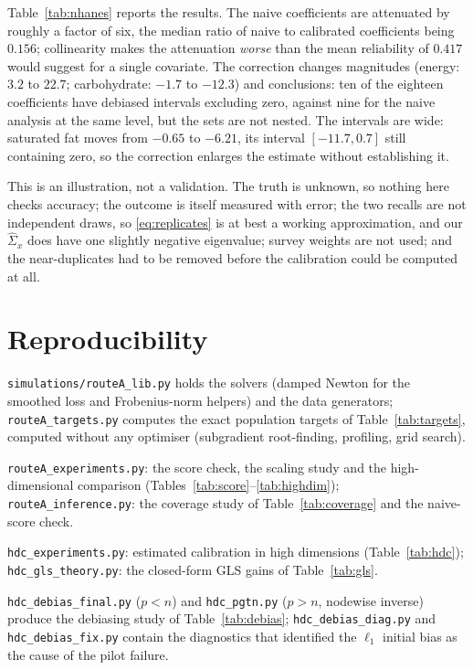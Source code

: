 \documentclass[12pt,a4paper]{article}
\theoremstyle{definition}
\theoremstyle{remark}
\begin{document}
Table~\ref{tab:nhanes} reports the results. The naive coefficients are attenuated by
roughly a factor of six, the median ratio of naive to calibrated coefficients being
$0.156$; collinearity makes the attenuation \emph{worse} than the mean reliability of
$0.417$ would suggest for a single covariate. The correction
changes magnitudes (energy: $3.2$ to $22.7$; carbohydrate: $-1.7$ to $-12.3$) and
conclusions: ten of the eighteen coefficients have debiased intervals excluding zero,
against nine for the naive analysis at the same level, but the sets are not nested. The
intervals are wide: saturated fat moves from $-0.65$ to $-6.21$, its interval
$[-11.7,0.7]$ still containing zero, so the correction enlarges the estimate without
establishing it.

This is an illustration, not a validation. The truth is unknown, so nothing here checks
accuracy; the outcome is itself measured with error; the two recalls are not independent
draws, so \eqref{eq:replicates} is at best a working
approximation, and our $\hat\Sigma_x$ does have one slightly negative eigenvalue; survey
weights are not used; and the near-duplicates had to be removed before the
calibration could be computed at all.



\section{Reproducibility}
\label{app:repro}

\sloppy
\texttt{simulations/routeA\_\allowbreak lib.py} holds the solvers (damped Newton for the smoothed loss and
Frobenius-norm helpers) and the data generators; \texttt{routeA\_\allowbreak targets.py} computes the exact
population targets of Table~\ref{tab:targets}, computed without any optimiser
(subgradient root-finding, profiling, grid search).

\texttt{routeA\_\allowbreak experiments.py}: the score check, the scaling study and the
high-dimensional comparison (Tables~\ref{tab:score}--\ref{tab:highdim});
\texttt{routeA\_\allowbreak inference.py}: the coverage study of Table~\ref{tab:coverage} and the
naive-score check.

\texttt{hdc\_\allowbreak experiments.py}: estimated calibration in high dimensions
(Table~\ref{tab:hdc}); \texttt{hdc\_\allowbreak gls\_\allowbreak theory.py}: the closed-form GLS gains of
Table~\ref{tab:gls}.

\texttt{hdc\_\allowbreak debias\_\allowbreak final.py} ($p<n$) and \texttt{hdc\_\allowbreak pgtn.py} ($p>n$, nodewise
inverse) produce the debiasing study of Table~\ref{tab:debias};
\texttt{hdc\_\allowbreak debias\_\allowbreak diag.py} and \texttt{hdc\_\allowbreak debias\_\allowbreak fix.py} contain the diagnostics that
identified the $\ell_1$ initial bias as the cause of the pilot failure.
\end{document}
